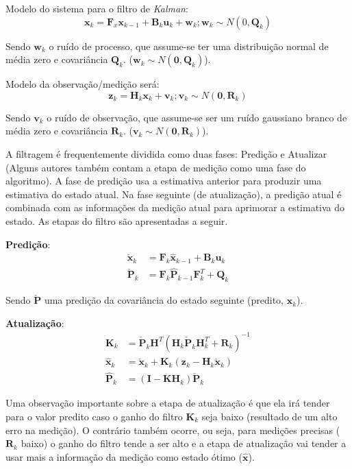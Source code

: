 Modelo do sistema para o filtro de \emph{Kalman}:
\begin{equation}
\textbf{x}_k = \textbf{F}_x \textbf{x}_{k-1} + \textbf{B}_k \textbf{u}_k + \textbf{w}_k; \textbf{w}_k \sim N(0, \textbf{Q}_k)
\end{equation}

Sendo $\textbf{w}_k$ o ruído de processo, que assume-se ter uma distribuição normal de média zero e covariância $\textbf{Q}_k$. ($\textbf{w}_k \sim N(\textbf{0}, \textbf{Q}_k)$).

Modelo da observação/medição será:
\begin{equation}
\textbf{z}_k = \textbf{H}_k \textbf{x}_k + \textbf{v}_k; \textbf{v}_k \sim N(\textbf{0}, \textbf{R}_k)
\end{equation}

Sendo $\textbf{v}_k$ o ruído de observação, que assume-se ser um ruído gaussiano branco de média zero e covariância $\textbf{R}_k$. ($\textbf{v}_k \sim N(\textbf{0}, \textbf{R}_k)$).

A filtragem é frequentemente dividida como duas fases: Predição e Atualizar (Alguns autores também contam a etapa de medição como uma fase do algoritmo). A fase de predição usa a estimativa anterior para produzir uma estimativa do estado atual. Na fase seguinte (de atualização), a predição atual é combinada com as informações da medição atual para aprimorar a estimativa do estado. As etapas do filtro são apresentadas a seguir.

\textbf{Predição}:
\begin{align*}
    \check{\textbf{x}}_k &= \textbf{F}_k \hat{\textbf{x}}_{k-1} + \textbf{B}_k \textbf{u}_k\\
    \check{\textbf{P}}_k &= \textbf{F}_k \hat{\textbf{P}}_{k-1} \textbf{F}^T_k + \textbf{Q}_k
\end{align*}

Sendo $\check{\textbf{P}}$ uma predição da covariância do estado seguinte (predito, $\textbf{x}_k$).

\textbf{Atualização}:
\begin{align*}
    \textbf{K}_k &= \check{\textbf{P}}_k \textbf{H}^T \left( \textbf{H}_k \check{\textbf{P}}_k \textbf{H}^T_k + \textbf{R}_k\right)^{-1}\\
    \hat{\textbf{x}}_k &= \check{\textbf{x}}_k + \textbf{K}_k\left( \textbf{z}_k - \textbf{H}_k \check{\textbf{x}}_k \right)\\
    \hat{\textbf{P}}_k &= \left(\textbf{I} - \textbf{KH}_k \right)\check{\textbf{P}}_k
\end{align*}

Uma observação importante sobre a etapa de atualização é que ela irá tender para o valor predito caso o ganho do filtro $\textbf{K}_k$ seja baixo (resultado de um alto erro na medição). O contrário também ocorre, ou seja, para medições precisas ($\textbf{R}_k$ baixo) o ganho do filtro tende a ser alto e a etapa de atualização vai tender a usar mais a informação da medição como estado ótimo ($\hat{\textbf{x}}$). 
